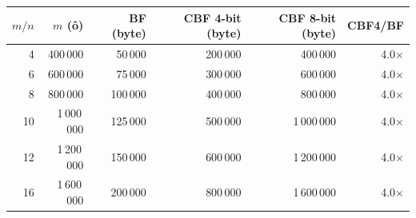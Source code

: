 \begin{tabular}{@{}rrrrrr@{}}
\toprule
$m/n$ & $m$ (ô) & BF (byte) & CBF 4-bit (byte) & CBF 8-bit (byte) & CBF4/BF\\
\midrule
4 & 400\,000 & 50\,000 & 200\,000 & 400\,000 & 4.0$\times$\\
6 & 600\,000 & 75\,000 & 300\,000 & 600\,000 & 4.0$\times$\\
8 & 800\,000 & 100\,000 & 400\,000 & 800\,000 & 4.0$\times$\\
10 & 1\,000\,000 & 125\,000 & 500\,000 & 1\,000\,000 & 4.0$\times$\\
12 & 1\,200\,000 & 150\,000 & 600\,000 & 1\,200\,000 & 4.0$\times$\\
16 & 1\,600\,000 & 200\,000 & 800\,000 & 1\,600\,000 & 4.0$\times$\\
\bottomrule
\end{tabular}
